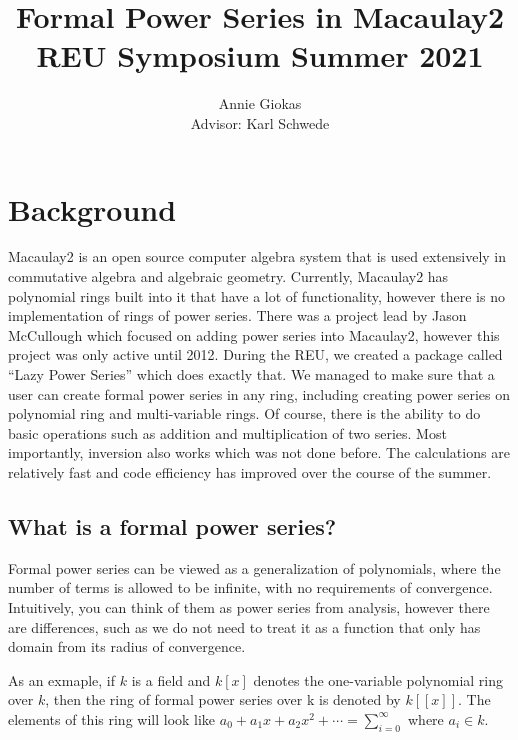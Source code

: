 \documentclass[11pt]{article}
\title{Formal Power Series in Macaulay2\\ \large REU Symposium Summer 2021}
\author{Annie Giokas\\{ Advisor: Karl Schwede}}
\begin{document}
    
    \maketitle
    




\hypertarget{background}{%
\section{Background}\label{background}}

Macaulay2 is an open source computer algebra system that is used
extensively in commutative algebra and algebraic geometry. Currently,
Macaulay2 has polynomial rings built into it that have a lot of
functionality, however there is no implementation of rings of power
series. There was a project lead by Jason McCullough which focused on
adding power series into Macaulay2, however this project was only active
until 2012.\cite{powerserieswiki} During the REU, we created a package called ``Lazy Power
Series'' which does exactly that. We managed to make sure that a user
can create formal power series in any ring, including creating power
series on polynomial ring and multi-variable rings. Of course, there is
the ability to do basic operations such as addition and multiplication
of two series. Most importantly, inversion also works which was not done
before. The calculations are relatively fast and code efficiency has
improved over the course of the summer.

\hypertarget{what-is-a-formal-power-series}{%
\subsection{What is a formal power
series?}\label{what-is-a-formal-power-series}}

Formal power series can be viewed as a generalization of polynomials,
where the number of terms is allowed to be infinite, with no
requirements of convergence. Intuitively, you can think of them as power
series from analysis, however there are differences, such as we do not
need to treat it as a function that only has domain from its radius of
convergence.

As an exmaple, if \(k\) is a field and \(k[x]\) denotes the one-variable
polynomial ring over \(k\), then the ring of formal power series over k
is denoted by \(k[[x]]\). The elements of this ring will look like
\(a_0+a_1x+a_2x^2+\cdots =\sum_{i=0}^{\infty}\) where \(a_i\in k\).
\end{document}
